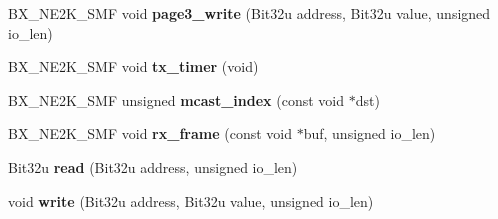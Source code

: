 \begin{DoxyCompactItemize}
\item 
\hypertarget{classbx__ne2k__c_a0b3925c293544d2288ccf6e1c81f5d87}{B\-X\-\_\-\-N\-E2\-K\-\_\-\-S\-M\-F void {\bfseries page3\-\_\-write} (Bit32u address, Bit32u value, unsigned io\-\_\-len)}\label{classbx__ne2k__c_a0b3925c293544d2288ccf6e1c81f5d87}

\item 
\hypertarget{classbx__ne2k__c_a95fc7395914b4793e1e74b830662a6b7}{B\-X\-\_\-\-N\-E2\-K\-\_\-\-S\-M\-F void {\bfseries tx\-\_\-timer} (void)}\label{classbx__ne2k__c_a95fc7395914b4793e1e74b830662a6b7}

\item 
\hypertarget{classbx__ne2k__c_a5f688a5d84b134997d011dcc8db8504e}{B\-X\-\_\-\-N\-E2\-K\-\_\-\-S\-M\-F unsigned {\bfseries mcast\-\_\-index} (const void $\ast$dst)}\label{classbx__ne2k__c_a5f688a5d84b134997d011dcc8db8504e}

\item 
\hypertarget{classbx__ne2k__c_aa5d314861515c0d6353aa9f4b56405ea}{B\-X\-\_\-\-N\-E2\-K\-\_\-\-S\-M\-F void {\bfseries rx\-\_\-frame} (const void $\ast$buf, unsigned io\-\_\-len)}\label{classbx__ne2k__c_aa5d314861515c0d6353aa9f4b56405ea}

\item 
\hypertarget{classbx__ne2k__c_a57e42d07a6bb408f428a3eace15921ff}{Bit32u {\bfseries read} (Bit32u address, unsigned io\-\_\-len)}\label{classbx__ne2k__c_a57e42d07a6bb408f428a3eace15921ff}

\item 
\hypertarget{classbx__ne2k__c_aa2a39611a06e9111e5218aa3e7dc0dd3}{void {\bfseries write} (Bit32u address, Bit32u value, unsigned io\-\_\-len)}\label{classbx__ne2k__c_aa2a39611a06e9111e5218aa3e7dc0dd3}

\end{DoxyCompactItemize}
